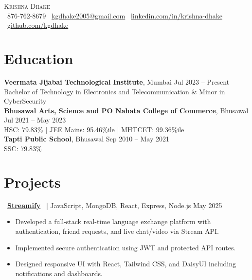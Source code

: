 \documentclass[a4paper,11pt]{article}
\begin{document}
  

\begin{center}     
    {\Huge \scshape Krishna Dhake} \\[4pt] 

    \faPhone \, 876-762-8679 \quad
    \faEnvelope \, \href{mailto:kgdhake2005@gmail.com}{kgdhake2005@gmail.com} \quad
    \faLinkedin \, \href{https://linkedin.com/in/krishna-dhake}{linkedin.com/in/krishna-dhake} 
    \\[4pt]

    \faGithub \, \href{https://github.com/kgdhake}{github.com/kgdhake} 
\end{center}     

\section{Education} 

\textbf{Veermata Jijabai Technological Institute}, Mumbai \hfill Jul 2023 -- Present \\ 
Bachelor of Technology in Electronics and Telecommunication \& Minor in CyberSecurity \\[4pt]  

\textbf{Bhusawal Arts, Science and PO Nahata College of Commerce}, Bhusawal \hfill Jul 2021 -- May 2023 \\ 
HSC: 79.83\% \quad | \quad JEE Mains: 95.46\%ile \quad | \quad MHTCET: 99.36\%ile \\[4pt]  

\textbf{Tapti Public School}, Bhusawal \hfill Sep 2010 -- May 2021 \\ 
SSC: 79.83\%    

\section{Projects} 

\faGithub \, \href{https://github.com/kgdhake/Video-Streaming-App}{\textbf{Streamify}} 
\, | JavaScript, MongoDB, React, Express, Node.js \hfill May 2025 
\begin{itemize}[leftmargin=*]   
    \item Developed a full-stack real-time language exchange platform with authentication, friend requests, and live chat/video via Stream API.   
    \item Implemented secure authentication using JWT and protected API routes.   
    \item Designed responsive UI with React, Tailwind CSS, and DaisyUI including notifications and dashboards. 
\end{itemize}  
\end{document}
